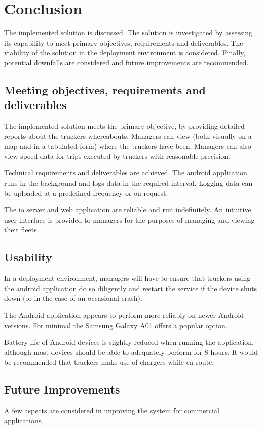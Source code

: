\section{Conclusion}
The implemented solution is discussed.
The solution is investigated by assessing its capability to meet primary objectives, requirements and deliverables.
The viability of the solution in the deployment environment is considered.
Finally, potential downfalls are considered and future improvements are recommended.

\subsection{Meeting objectives, requirements and deliverables}
The implemented solution meets the primary objective, by providing detailed reports about the truckers whereabouts.
Managers can view (both visually on a map and in a tabulated form) where the truckers have been.
Managers can also view speed data for trips executed by truckers with reasonable precision.

Technical requirements and deliverables are achieved.
The android application runs in the background and logs data in the required interval.
Logging data can be uploaded at a predefined frequency or on request.

The \ac{io} server and web application are reliable and run indefinitely.
An intuitive user interface is provided to managers for the purposes of managing and viewing their fleets.

\subsection{Usability}
In a deployment environment, managers will have to ensure that truckers using the android application do so diligently and restart the service if the device shuts down (or in the case of an occasional crash).

The Android application appears to perform more reliably on newer Android versions.
For minimal the Samsung Galaxy A01 offers a popular option.

Battery life of Android devices is slightly reduced when running the application, although most devices should be able to adequately perform for 8 hours.
It would be recommended that truckers make use of chargers while en route.

\subsection{Future Improvements}
A few aspects are considered in improving the system for commercial applications.

